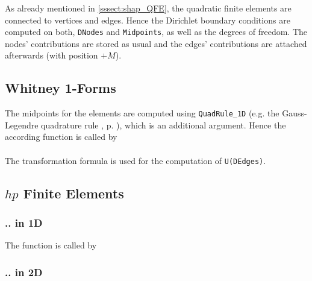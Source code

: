  As already mentioned in \ref{sssect:shap_QFE}, the quadratic finite elements are connected to vertices and edges. Hence the Dirichlet boundary conditions  are computed on both, {\tt DNodes} and {\tt Midpoints}, as well as the degrees of freedom. The nodes' contributions are stored as usual and the edges' contributions are attached afterwards (with position $+M$).




\subsection{Whitney 1-Forms} 

 The midpoints for the elements are computed using {\tt QuadRule\_1D} (e.g. the Gauss-Legendre quadrature rule , p. \pageref{sect:quad_rule_1d}), which is an additional argument. Hence the according function  is called by \\

 \\

The transformation formula is used for the computation of {\tt U(DEdges)}.



\subsection{$hp$ Finite Elements} 

\subsubsection{.. in 1D}

The function  is called by \\



\subsubsection{.. in 2D} \label{ssect:hp_dir}

